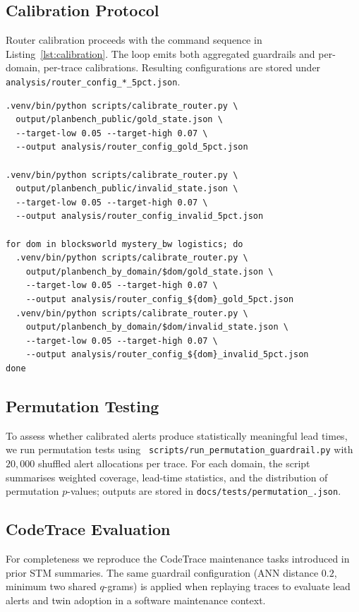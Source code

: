 \documentclass[11pt]{article}
\begin{document}
\subsection{Calibration Protocol}
Router calibration proceeds with the command sequence in
Listing~\ref{lst:calibration}. The loop emits both aggregated guardrails and
per-domain, per-trace calibrations. Resulting configurations are stored under
\texttt{analysis/router\_config\_*\_5pct.json}.

\begin{lstlisting}[style=stm, caption={Router calibration commands.}, label={lst:calibration}]
.venv/bin/python scripts/calibrate_router.py \
  output/planbench_public/gold_state.json \
  --target-low 0.05 --target-high 0.07 \
  --output analysis/router_config_gold_5pct.json

.venv/bin/python scripts/calibrate_router.py \
  output/planbench_public/invalid_state.json \
  --target-low 0.05 --target-high 0.07 \
  --output analysis/router_config_invalid_5pct.json

for dom in blocksworld mystery_bw logistics; do
  .venv/bin/python scripts/calibrate_router.py \
    output/planbench_by_domain/$dom/gold_state.json \
    --target-low 0.05 --target-high 0.07 \
    --output analysis/router_config_${dom}_gold_5pct.json
  .venv/bin/python scripts/calibrate_router.py \
    output/planbench_by_domain/$dom/invalid_state.json \
    --target-low 0.05 --target-high 0.07 \
    --output analysis/router_config_${dom}_invalid_5pct.json
done
\end{lstlisting}

\subsection{Permutation Testing}
\label{subsec:permutation}
To assess whether calibrated alerts produce statistically meaningful lead times,
we run permutation tests using \
\texttt{scripts/run\_permutation\_guardrail.py} with $20{,}000$ shuffled alert
allocations per trace. For each domain, the script summarises weighted coverage,
lead-time statistics, and the distribution of permutation $p$-values; outputs are
stored in \texttt{docs/tests/permutation\_\*.json}.

\subsection{CodeTrace Evaluation}
For completeness we reproduce the CodeTrace maintenance tasks introduced in
prior STM summaries. The same guardrail configuration (ANN distance $0.2$,
minimum two shared $q$-grams) is applied when replaying traces to evaluate lead
alerts and twin adoption in a software maintenance context.
\end{document}
